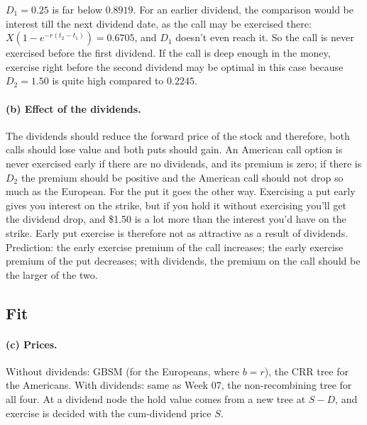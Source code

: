 \documentclass[11pt]{article}
\newcommand{\tbl}[1]{}
\begin{document}
$D_1=0.25$ is far below $0.8919$. For an earlier dividend, the comparison would be interest till the next dividend date, as the call may be exercised there: $X(1-e^{-r(t_2-t_1)})=0.6705$, and $D_1$ doesn't even reach it. So the call is never exercised before the first dividend. If the call is deep enough in the money, exercise right before the second dividend may be optimal in this case because $D_2=1.50$ is quite high compared to $0.2245$.

\paragraph{(b) Effect of the dividends.} The dividends should reduce the forward price of the stock and therefore, both calls should lose value and both puts should gain. An American call option is never exercised early if there are no dividends, and its premium is zero; if there is $D_2$ the premium should be positive and the American call should not drop so much as the European. For the put it goes the other way. Exercising a put early gives you interest on the strike, but if you hold it without exercising you'll get the dividend drop, and \$1.50 is a lot more than the interest you'd have on the strike. Early put exercise is therefore not as attractive as a result of dividends. Prediction: the early exercise premium of the call increases; the early exercise premium of the put decreases; with dividends, the premium on the call should be the larger of the two.

\subsection*{Fit}

\paragraph{(c) Prices.} Without dividends: GBSM (for the Europeans, where $b=r$), the CRR tree \citep{cox1979option} for the Americans. With dividends: same as Week 07, the non-recombining tree for all four. At a dividend node the hold value comes from a new tree at $S-D$, and exercise is decided with the cum-dividend price $S$.

\begin{table}[H]
\centering\small
\caption{Option values, $N=500$. ``Effect'' is dividends minus no dividends, both from the tree. ``GBSM on $S-PV(D)$'' subtracts \$1.7221 from $S$.}
\label{tab:p2prices}
\resizebox{\textwidth}{!}{\tbl{p2_prices}}
\end{table}
\end{document}
